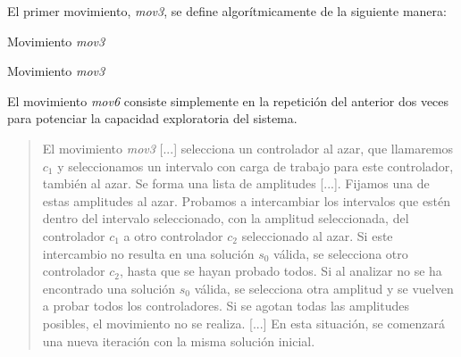El primer movimiento, \textit{mov3}, se define algorítmicamente de la siguiente manera:

\begin{algorithm}[h]
	\DontPrintSemicolon
	\LinesNumbered
	\bigskip
	
	
	\caption{Movimiento \textit{mov3}}
	\label{algoritmo:entorno-mov3}
\end{algorithm}

\begin{algorithm}[h]
	\DontPrintSemicolon
	\LinesNumbered
	\bigskip
	
	
	\caption{Movimiento \textit{mov3}}
	\label{algoritmo:entorno-mov3}
\end{algorithm}

El movimiento \textit{mov6} consiste simplemente en la repetición del anterior dos veces para potenciar la capacidad exploratoria del sistema.

\begin{quotation}
	El movimiento \textit{mov3} [...] selecciona un controlador al azar, que llamaremos $c_1$ y seleccionamos un
	intervalo con carga	de trabajo para este controlador, también al azar. Se forma una lista de amplitudes [...]. Fijamos una de estas amplitudes al azar. Probamos a intercambiar los intervalos que estén dentro del intervalo
	seleccionado, con la amplitud seleccionada, del controlador $c_1$ a otro controlador $c_2$ seleccionado al azar. Si este intercambio no resulta en una solución $s_0$ válida, se selecciona
	otro controlador $c_2$, hasta que se hayan probado todos. Si al analizar no se ha
	encontrado una solución $s_0$ válida, se selecciona otra amplitud y se vuelven a probar
	todos los controladores. Si se agotan todas las amplitudes posibles, el movimiento
	no se realiza. [...] En esta situación, se comenzará una nueva iteración con la misma solución inicial.
	
\end{quotation}

